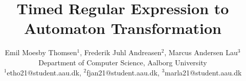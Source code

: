 \documentclass{article}
\begin{document}


\clearpage
\setcounter{page}{1}

\title{Timed Regular Expression to Automaton Transformation}


\author{Emil Moesby Thomsen$^1$, Frederik Juhl Andreasen$^2$, Marcus Andersen Lau$^3$\\
    \small{Department of Computer Science, Aalborg University}\\
    \small{$^1$etho21@student.aau.dk, $^2$fjan21@student.aau.dk, $^3$marla21@student.aau.dk}}
\maketitle


\begin{multicols}{2}
    \raggedcolumns
    \begin{abstract}
        
    \end{abstract}
    
    
    
    
    
    
\end{multicols}

\printbibliography{}


\end{document}
